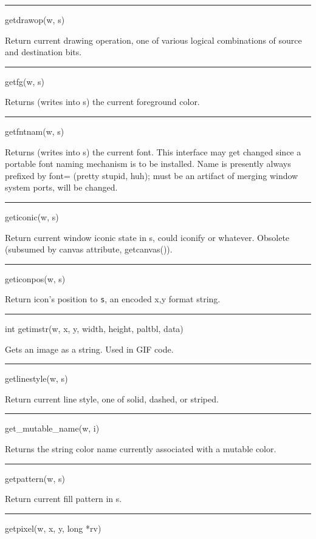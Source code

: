 \bigskip\hrule\vspace{0.1cm}
\noindent
getdrawop(w, s)


Return current drawing operation, one of various logical combinations
of source and destination bits.


\bigskip\hrule\vspace{0.1cm}
\noindent
getfg(w, s)


Returns (writes into s) the current foreground color.


\bigskip\hrule\vspace{0.1cm}
\noindent
getfntnam(w, s)


Returns (writes into s) the current font. This interface may get
changed since a portable font naming mechanism is to be
installed. Name is presently always prefixed by
{\textquotedbl}font={\textquotedbl} (pretty stupid, huh); must be an
artifact of merging window system ports, will be changed.


\bigskip\hrule\vspace{0.1cm}
\noindent
geticonic(w, s)


Return current window iconic state in s, could
{\textquotedbl}iconify{\textquotedbl} or whatever. Obsolete (subsumed
by canvas attribute, getcanvas()).


\bigskip\hrule\vspace{0.1cm}
\noindent
geticonpos(w, s)


Return icon's position to \texttt{s}, an encoded
{\textquotedbl}x,y{\textquotedbl} format string.


\bigskip\hrule\vspace{0.1cm}
\noindent
int getimstr(w, x, y, width, height, paltbl, data)


Gets an image as a string. Used in GIF code.


\bigskip\hrule\vspace{0.1cm}
\noindent
getlinestyle(w, s)


Return current line style, one of solid, dashed, or striped.


\bigskip\hrule\vspace{0.1cm}
\noindent
get\_mutable\_name(w, i)


Returns the string color name currently associated with a mutable color.


\bigskip\hrule\vspace{0.1cm}
\noindent
getpattern(w, s)


Return current fill pattern in s.


\bigskip\hrule\vspace{0.1cm}
\noindent
getpixel(w, x, y, long *rv)


